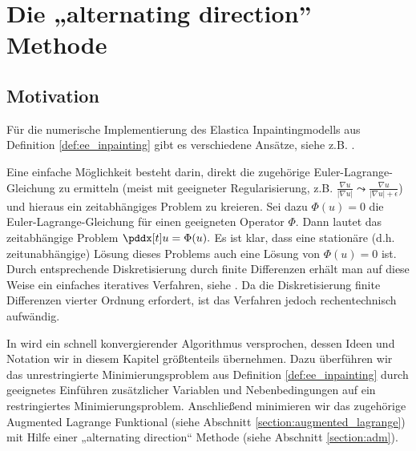 \documentclass{mythesis}
\begin{document}
\chapter{Die „alternating direction” Methode} \label{chap:adm}


\section{Motivation} %


Für die numerische Implementierung des Elastica Inpaintingmodells aus Definition \ref{def:ee_inpainting} gibt es verschiedene Ansätze, siehe z.B. \cite{shen2002euler,tai2011fast,ballester2001filling,brito2010fast,yashtini2015alternating,hahn2011fast,duan2013fast}.

Eine einfache Möglichkeit besteht darin, direkt die zugehörige Euler-Lagrange-Gleichung zu ermitteln (meist mit geeigneter Regularisierung, z.B. $\frac{\nabla u}{|\nabla u|} \leadsto \frac{\nabla u}{|\nabla u| + \epsilon}$) und hieraus ein zeitabhängiges Problem zu kreieren.
Sei dazu $\Phi(u) = 0$ die Euler-Lagrange-Gleichung für einen geeigneten Operator $\Phi$.
Dann lautet das zeitabhängige Problem
\begin{math}
    \pddx[t] u = \Phi(u).
\end{math}
Es ist klar, dass eine stationäre (d.h. zeitunabhängige) Lösung dieses Problems auch eine Lösung von $\Phi(u) = 0$ ist.
Durch entsprechende Diskretisierung durch finite Differenzen erhält man auf diese Weise ein einfaches iteratives Verfahren, siehe \cite{shen2002euler}.
Da die Diskretisierung finite Differenzen vierter Ordnung erfordert, ist das Verfahren jedoch rechentechnisch aufwändig.

In \cite{tai2011fast} wird ein schnell konvergierender Algorithmus versprochen, dessen Ideen und Notation wir in diesem Kapitel größtenteils übernehmen.
Dazu überführen wir das unrestringierte Minimierungsproblem aus Definition \ref{def:ee_inpainting} durch geeignetes Einführen zusätzlicher Variablen und Nebenbedingungen auf ein restringiertes Minimierungsproblem.
Anschließend minimieren wir das zugehörige Augmented Lagrange Funktional (siehe Abschnitt \ref{section:augmented_lagrange}) mit Hilfe einer „alternating direction“ Methode (siehe Abschnitt \ref{section:adm}).
\end{document}
